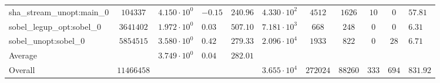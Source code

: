 \begin{tabular}{|l|c|HHc|c|c|c|c|cH|}
sha\_stream\_unopt:main\_0                      & $ 104337   $ & $ 4.150 \cdot 10^{0} $ & $ -0.15 $ & $ 240.96 $ & $ 4.330 \cdot 10^{2}  $ & $ 4512   $ & $ 1626  $ & $ 10  $ & $ 0   $ & $ 57.81   $ \\
sobel\_legup\_opt:sobel\_0                      & $ 3641402  $ & $ 1.972 \cdot 10^{0} $ & $ 0.03  $ & $ 507.10 $ & $ 7.181 \cdot 10^{3}  $ & $ 668    $ & $ 248   $ & $ 0   $ & $ 0   $ & $ 6.31    $ \\
sobel\_unopt:sobel\_0                           & $ 5854515  $ & $ 3.580 \cdot 10^{0} $ & $ 0.42  $ & $ 279.33 $ & $ 2.096 \cdot 10^{4}  $ & $ 1933   $ & $ 822   $ & $ 0   $ & $ 28  $ & $ 6.71    $ \\
\hline
Average                                         & $          $ & $ 3.749 \cdot 10^{0} $ & $ 0.04  $ & $ 282.01 $ & $                     $ & $        $ & $       $ & $     $ & $     $ & $         $ \\
\hline
Overall                                         & $ 11466458 $ & $                    $ & $       $ & $        $ & $ 3.655 \cdot 10^{4}  $ & $ 272024 $ & $ 88260 $ & $ 333 $ & $ 694 $ & $ 831.92  $ \\
\hline
\end{tabular}
